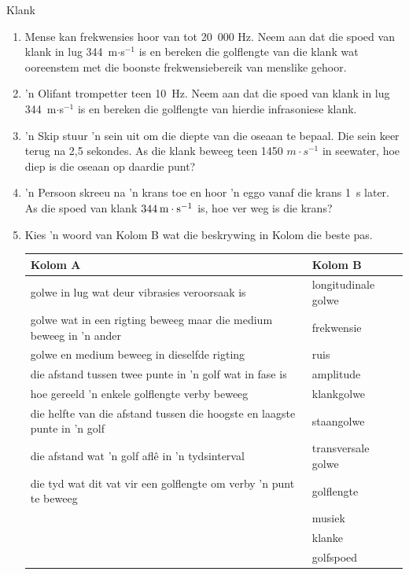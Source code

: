 \begin{eocexercises}{Klank}
\begin{enumerate}[noitemsep, label=\textbf{\arabic*}. ]
\item Mense kan frekwensies hoor van tot 20~000 Hz. Neem aan dat die spoed van klank in lug 344~m$\ensuremath{\cdot}$s${}^{-1}$ is en bereken die golflengte van die klank wat ooreenstem met die boonste frekwensiebereik van menslike gehoor.

\item 'n Olifant trompetter teen 10~Hz. Neem aan dat die spoed van klank in lug 344~m$\ensuremath{\cdot}$s${}^{-1}$ is en bereken die golflengte van hierdie infrasoniese klank.

\item 'n Skip stuur 'n sein uit om die diepte van die oseaan te bepaal. Die sein keer terug na 2,5 sekondes. As die klank beweeg teen 1450 $m\cdot s^{-1}$ in seewater, hoe diep is die oseaan op daardie punt?

\item 'n Persoon skreeu na 'n krans toe en hoor 'n eggo vanaf die krans 1~s later. As die spoed van klank $344\phantom{\rule{2pt}{0ex}}\text{m}\ensuremath{\cdot}\text{s}{}^{-1}$ is, hoe ver weg is die krans?

\item Kies 'n woord van Kolom B wat die beskrywing in Kolom die beste pas.
\begin{center}
\begin{tabular}{ll}
\textbf{Kolom A} & \textbf{Kolom B} \\ \hline
golwe in lug wat deur vibrasies veroorsaak is & longitudinale golwe \\
golwe wat in een rigting beweeg maar die medium beweeg in 'n ander & frekwensie \\
golwe en medium beweeg in dieselfde rigting  & ruis \\
die afstand tussen twee punte in 'n golf wat in fase is & amplitude \\
hoe gereeld 'n enkele golflengte verby beweeg & klankgolwe \\
die helfte van die afstand tussen die hoogste en laagste punte in 'n golf & staangolwe \\
die afstand wat 'n golf afl\^e in 'n tydsinterval & transversale golwe \\
die tyd wat dit vat vir een golflengte om verby 'n punt te beweeg & golflengte \\
& musiek \\
& klanke \\
& golfspoed \\
\end{tabular}
\end{center}
\end{enumerate}
  \label{m38800**end}
  \label{9b5d72dd5f0585e544578ab90a9956a8**end}
\end{eocexercises}
